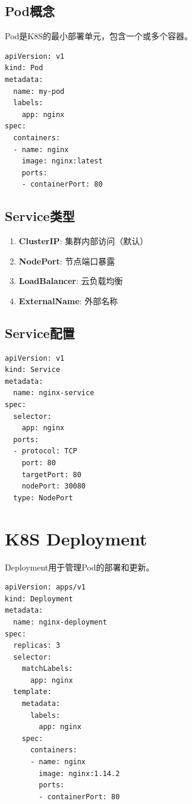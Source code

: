 \documentclass[12pt,UTF8]{ctexbook}
\begin{document}
\subsection{Pod概念}

Pod是K8S的最小部署单元，包含一个或多个容器。

\begin{lstlisting}
apiVersion: v1
kind: Pod
metadata:
  name: my-pod
  labels:
    app: nginx
spec:
  containers:
  - name: nginx
    image: nginx:latest
    ports:
    - containerPort: 80
\end{lstlisting}

\subsection{Service类型}

\begin{enumerate}
    \item \textbf{ClusterIP}: 集群内部访问（默认）
    \item \textbf{NodePort}: 节点端口暴露
    \item \textbf{LoadBalancer}: 云负载均衡
    \item \textbf{ExternalName}: 外部名称
\end{enumerate}

\subsection{Service配置}

\begin{lstlisting}
apiVersion: v1
kind: Service
metadata:
  name: nginx-service
spec:
  selector:
    app: nginx
  ports:
  - protocol: TCP
    port: 80
    targetPort: 80
    nodePort: 30080
  type: NodePort
\end{lstlisting}

\section{K8S Deployment}
\label{sec:k8s-deployment}

Deployment用于管理Pod的部署和更新。

\begin{lstlisting}
apiVersion: apps/v1
kind: Deployment
metadata:
  name: nginx-deployment
spec:
  replicas: 3
  selector:
    matchLabels:
      app: nginx
  template:
    metadata:
      labels:
        app: nginx
    spec:
      containers:
      - name: nginx
        image: nginx:1.14.2
        ports:
        - containerPort: 80
\end{lstlisting}
\end{document}
